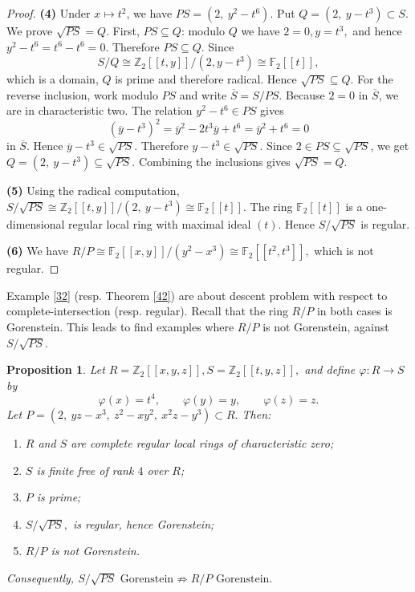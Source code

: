 \documentclass[10pt,a4paper]{amsart}
\newtheorem{proposition}[theorem]{Proposition}
\theoremstyle{definition}
\theoremstyle{remark}
\begin{document}
\begin{proof}
	\textbf{(4)}
	Under \(x\mapsto t^2\), we have
	\(
	PS=(2,\ y^2-t^6).
	\)
	Put
	\(
	Q=(2,\ y-t^3)\subset S.
	\)
	We prove \(\sqrt{PS}=Q\).
	First, \(PS\subseteq Q\): modulo \(Q\) we have
	\(
	2=0,y=t^3,
	\)
	and hence
	\(
	y^2-t^6=t^6-t^6=0.
	\)
	Therefore \(PS\subseteq Q\). Since
	\[
	S/Q\cong\mathbb Z_2[[t,y]]/(2,y-t^3)\cong\mathbb F_2[[t]],
	\]
	which is a domain, \(Q\) is prime and therefore radical. Hence
	\(
	\sqrt{PS}\subseteq Q.
	\)
	For the reverse inclusion, work modulo \(PS\) and write
	\(
	\overline{S}=S/PS.
	\)
	Because \(2=0\) in \(\overline{S}\), we are in characteristic two.
	The relation
	\(
	y^2-t^6\in PS
	\)
	gives
	\[
	(\overline{y}-t^3)^2
	=
	\overline{y}^2-2t^3\overline{y}+t^6
	=
	\overline{y}^2+t^6
	=
	0
	\]
	in \(\overline{S}\).
	Hence
	\(
	\overline{y}-t^3\in\sqrt{PS}.
	\)
	Therefore \(y-t^3\in\sqrt{PS}\). Since \(2\in PS\subseteq\sqrt{PS}\),
	we get
	\(
	Q=(2,\ y-t^3)\subseteq\sqrt{PS}.
	\)
	Combining the inclusions gives
	$\sqrt{PS}=Q.$
	
	\textbf{(5)}
	Using the radical computation,
	\(
	S/\sqrt{PS}
	\cong
	\mathbb Z_2[[t,y]]/(2,\ y-t^3)
	\cong
	\mathbb F_2[[t]].
	\)
	The ring \(\mathbb F_2[[t]]\) is a one-dimensional regular local ring
	with maximal ideal \((t)\). Hence \(S/\sqrt{PS}\) is regular.
	
	\textbf{(6)}
	We have
	\(
	R/P
	\cong
	\mathbb F_2[[x,y]]/(y^2-x^3)
	\cong
	\mathbb F_2[[t^2,t^3]],
	\)
	which is   not regular.
\end{proof}










{Example} \ref{32} (resp.
Theorem \ref{42}) are about descent problem with respect to complete-intersection (resp. regular). Recall that the ring $R/P$ in both cases is Gorenstein. This leads to find examples where $R/P$ is not Gorenstein, against  $S/\sqrt{PS}$.
 
 \begin{proposition}
 	Let
 	\(
 	R=\mathbb Z_2[[x,y,z]],
 	S=\mathbb Z_2[[t,y,z]],
 	\)
 	and define
 	\(
 	\varphi:R\to S
 	\)
 	by
 	\[
 	\varphi(x)=t^4,\qquad
 	\varphi(y)=y,\qquad
 	\varphi(z)=z.
 	\]
 	Let
 	\(
 	P=(2,\ yz-x^3,\ z^2-xy^2,\ x^2z-y^3)\subset R.
 	\)
 	Then:
 	\begin{enumerate}
 		\item $R$ and $S$ are complete regular local rings of characteristic
 		zero;
 		\item $S$ is finite free of rank $4$ over $R$;
 		\item $P$ is prime;
 	\item
 		\(
 		S/\sqrt{PS},
 		\)
 	 is regular, hence Gorenstein;
 		\item $R/P$ is not Gorenstein.
 	\end{enumerate}
 	Consequently,
 	\(
 	{
 		S/\sqrt{PS}\text{ Gorenstein}
 		\not\Longrightarrow
 		R/P\text{ Gorenstein}.
 	}
 	\)
 \end{proposition}
 
\end{document}
